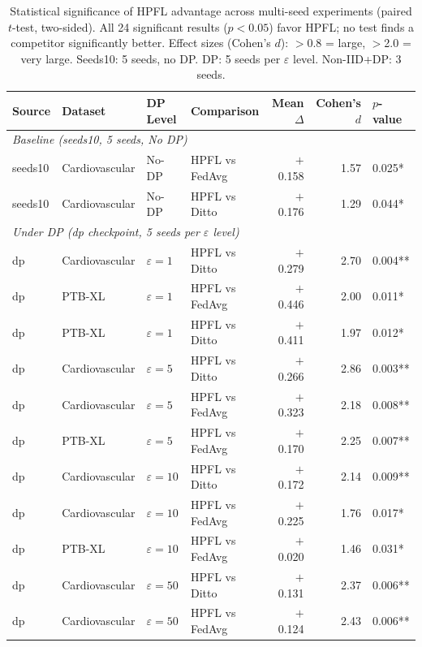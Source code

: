 \documentclass[conference]{IEEEtran}
\begin{document}
\begin{table}[htbp]
\centering
\caption{Statistical significance of HPFL advantage across multi-seed experiments (paired $t$-test, two-sided). All 24 significant results ($p{<}0.05$) favor HPFL; no test finds a competitor significantly better. Effect sizes (Cohen's $d$): $>$0.8 = large, $>$2.0 = very large. Seeds10: 5 seeds, no DP. DP: 5 seeds per $\varepsilon$ level. Non-IID+DP: 3 seeds.}
\label{tab:significance_extended}
\small
\begin{tabular}{llllrrl}
\toprule
\textbf{Source} & \textbf{Dataset} & \textbf{DP Level} & \textbf{Comparison} & \textbf{Mean $\Delta$} & \textbf{Cohen's $d$} & \textbf{$p$-value} \\
\midrule
\multicolumn{7}{l}{\textit{Baseline (seeds10, 5 seeds, No DP)}} \\
seeds10 & Cardiovascular & No-DP & HPFL vs FedAvg & $+$0.158 & 1.57 & 0.025* \\
seeds10 & Cardiovascular & No-DP & HPFL vs Ditto & $+$0.176 & 1.29 & 0.044* \\
\midrule
\multicolumn{7}{l}{\textit{Under DP (dp checkpoint, 5 seeds per $\varepsilon$ level)}} \\
dp & Cardiovascular & $\varepsilon{=}1$ & HPFL vs Ditto & $+$0.279 & 2.70 & 0.004** \\
dp & PTB-XL & $\varepsilon{=}1$ & HPFL vs FedAvg & $+$0.446 & 2.00 & 0.011* \\
dp & PTB-XL & $\varepsilon{=}1$ & HPFL vs Ditto & $+$0.411 & 1.97 & 0.012* \\
dp & Cardiovascular & $\varepsilon{=}5$ & HPFL vs Ditto & $+$0.266 & 2.86 & 0.003** \\
dp & Cardiovascular & $\varepsilon{=}5$ & HPFL vs FedAvg & $+$0.323 & 2.18 & 0.008** \\
dp & PTB-XL & $\varepsilon{=}5$ & HPFL vs FedAvg & $+$0.170 & 2.25 & 0.007** \\
dp & Cardiovascular & $\varepsilon{=}10$ & HPFL vs Ditto & $+$0.172 & 2.14 & 0.009** \\
dp & Cardiovascular & $\varepsilon{=}10$ & HPFL vs FedAvg & $+$0.225 & 1.76 & 0.017* \\
dp & PTB-XL & $\varepsilon{=}10$ & HPFL vs FedAvg & $+$0.020 & 1.46 & 0.031* \\
dp & Cardiovascular & $\varepsilon{=}50$ & HPFL vs Ditto & $+$0.131 & 2.37 & 0.006** \\
dp & Cardiovascular & $\varepsilon{=}50$ & HPFL vs FedAvg & $+$0.124 & 2.43 & 0.006** \\

\end{tabular}
\end{table}
\end{document}
